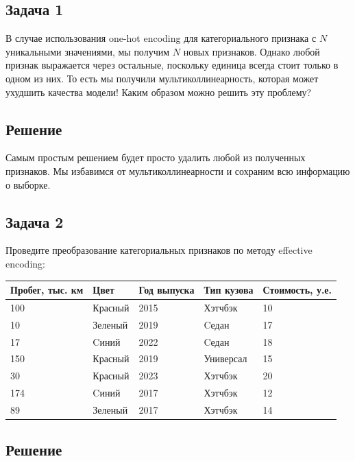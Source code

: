 \subsection*{Задача 1}

В случае использования one-hot encoding для категориального признака с $N$ уникальными значениями, мы получим $N$ новых признаков. Однако любой признак выражается через остальные, поскольку единица всегда стоит только в одном из них. То есть мы получили мультиколлинеарность, которая может ухудшить качества модели! Каким образом можно решить эту проблему?

\subsection*{Решение}

Самым простым решением будет просто удалить любой из полученных признаков. Мы избавимся от мультиколлинеарности и сохраним всю информацию о выборке.

\subsection*{Задача 2}

Проведите преобразование категориальных признаков по методу effective encoding:
\begin{table}[ht]
	\footnotesize
	\begin{tabular}{lllll}
		\hline
		Пробег, тыс. км & Цвет    & Год выпуска & Тип кузова & Стоимость, у.е. \\ \hline
		100             & Красный & 2015        & Хэтчбэк    & 10           \\
		10              & Зеленый & 2019        & Cедан      & 17           \\
		17              & Cиний   & 2022        & Cедан      & 18           \\
		150             & Красный & 2019        & Универсал  & 15           \\
		30              & Красный & 2023        & Хэтчбэк    & 20           \\
		174             & Cиний   & 2017        & Хэтчбэк    & 12           \\
		89              & Зеленый & 2017        & Хэтчбэк    & 14           \\ \hline
	\end{tabular}
\end{table}

\subsection*{Решение}

